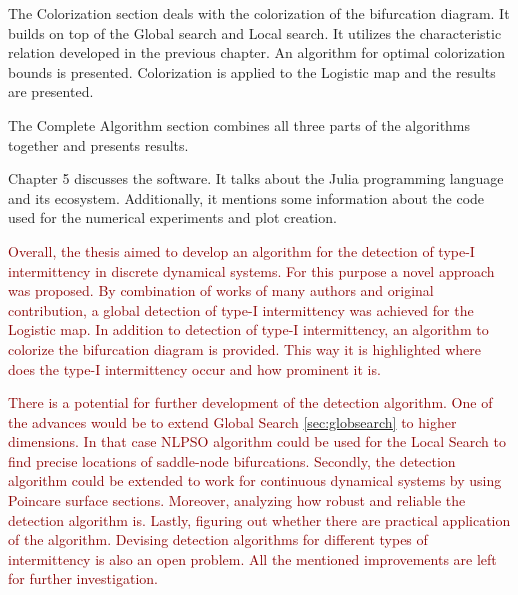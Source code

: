 \par
The Colorization section deals with the colorization of the bifurcation diagram.
It builds on top of the Global search and Local search.
It utilizes the characteristic relation developed in the previous chapter.
An algorithm for optimal colorization bounds is presented.
Colorization is applied to the Logistic map and the results are presented.
\par
The Complete Algorithm section combines all three parts of the algorithms together and presents results.
\par
Chapter 5 discusses the software.
It talks about the Julia programming language and its ecosystem.
Additionally, it mentions some information about the code used for the numerical experiments and plot creation.
\par
\textcolor{darkred}{
Overall, the thesis aimed to develop an algorithm for the detection of type-I intermittency in discrete dynamical systems.
For this purpose a novel approach was proposed.
By combination of works of many authors and original contribution, a global detection of type-I intermittency was achieved for the Logistic map.
In addition to detection of type-I intermittency, an algorithm to colorize the bifurcation diagram is provided.
This way it is highlighted where does the type-I intermittency occur and how prominent it is.
}
\par
\textcolor{darkred}{
There is a potential for further development of the detection algorithm.
One of the advances would be to extend Global Search \ref{sec:globsearch} to higher dimensions.
In that case NLPSO algorithm could be used for the Local Search to find precise locations of saddle-node bifurcations.
Secondly, the detection algorithm could be extended to work for continuous dynamical systems by using Poincare surface sections.
Moreover, analyzing how robust and reliable the detection algorithm is.
Lastly, figuring out whether there are practical application of the algorithm.
Devising detection algorithms for different types of intermittency is also an open problem.
All the mentioned improvements are left for further investigation.
}

\endinput